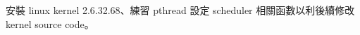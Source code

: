 \documentclass{res}
\begin{document}
 


\address{\\R03922106 蔡佑隆 unzledick@yahoo.com.tw\\ R04922067 楊翔雲 morris821028@gmail.com}

\begin{resume}

\vspace*{.1in} 

安裝 linux kernel 2.6.32.68、練習 pthread 設定 scheduler 相關函數以利後續修改 kernel source code。

\vspace*{.1in} 


\end{resume}
\end{document}
